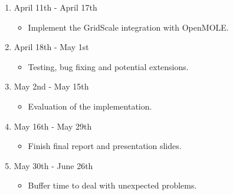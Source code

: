 \begin{enumerate}
	\item April 11th - April 17th
	\begin{itemize}
		\item Implement the GridScale integration with OpenMOLE.
	\end{itemize}
	
	\item April 18th - May 1st
	\begin{itemize}
		\item Testing, bug fixing and potential extensions.
	\end{itemize}
	
	\item May 2nd - May 15th
	\begin{itemize}
		\item Evaluation of the implementation.
	\end{itemize}

	\item May 16th - May 29th
	\begin{itemize}
		\item Finish final report and presentation slides.
	\end{itemize}
	
	\item May 30th - June 26th
	\begin{itemize}
		\item Buffer time to deal with unexpected problems.
	\end{itemize}
\end{enumerate}